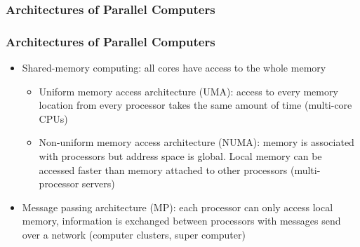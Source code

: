 
\subsubsection{Architectures of Parallel Computers}

\begin{frame}
\frametitle<presentation>{Architectures of Parallel Computers}
\begin{itemize}
\item Shared-memory computing: all cores have access to the whole memory
\begin{itemize}
\item Uniform memory access architecture (UMA): access to every memory location from every processor takes the
same amount of time (multi-core CPUs)
\item Non-uniform memory access architecture (NUMA): memory is associated with processors but address space is 
global. Local memory can be accessed faster than memory attached
to other processors (multi-processor servers)
\end{itemize}
\item Message passing architecture (MP): each processor can only access local memory, information is exchanged
between processors with messages send over a network (computer clusters, super computer)
\end{itemize}
\end{frame}


